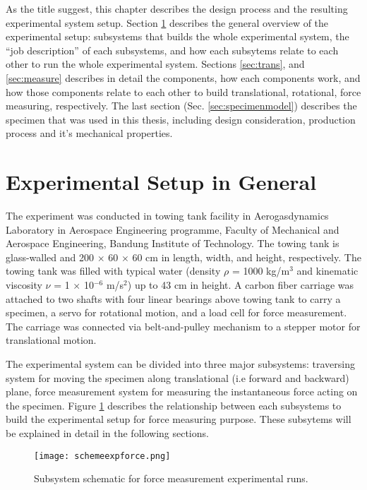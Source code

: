 As the title suggest, this chapter describes the design process and the resulting experimental system setup. Section \ref{sec:setup} describes the general overview of the experimental setup: subsystems that builds the whole experimental system, the ``job description'' of each subsystems, and how each subsytems relate to each other to run the whole experimental system. Sections \ref{sec:trans}, and \ref{sec:measure} describes in detail the components, how each components work, and how those components relate to each other to build translational, rotational, force measuring, respectively. The last section (Sec. \ref{sec:specimenmodel}) describes the specimen that was used in this thesis, including design consideration, production process and it's mechanical properties.\par
\section{Experimental Setup in General}
\label{sec:setup}
The experiment was conducted in towing tank facility in Aerogasdynamics Laboratory in Aerospace Engineering programme, Faculty of Mechanical and Aerospace Engineering, Bandung Institute of Technology. The towing tank is glass-walled and 200 $\times$ 60 $\times$ 60 cm in length, width, and height, respectively. The towing tank was filled with typical water (density $\rho$ = 1000 kg/m$^{3}$ and kinematic viscosity $\nu$ = 1 $\times$ 10$^{-6}$ m/s$^{2}$) up to 43 cm in height. A carbon fiber carriage was attached to two shafts with four linear bearings above towing tank to carry a specimen, a servo for rotational motion, and a load cell for force measurement. The carriage was connected via belt-and-pulley mechanism to a stepper motor for translational motion.\par
The experimental system can be divided into three major subsystems: traversing system for moving the specimen along translational (i.e forward and backward) plane, force measurement system for measuring the instantaneous force acting on the specimen. Figure \ref{fig:schemeexpforce} describes the relationship between each subsystems to build the experimental setup for force measuring purpose. These subsytems will be explained in detail in the following sections.
\begin{figure}[H]
    \centering
    \texttt{[image: schemeexpforce.png]}
    \caption{Subsystem schematic for force measurement experimental runs.}
    \label{fig:schemeexpforce}
\end{figure}
